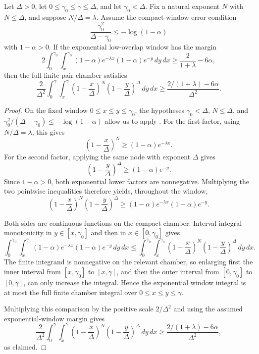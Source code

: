 \begin{helper}
Let \(\Delta>0\), let \(0\le\gamma_0\le\gamma\le\Delta\), and let
\(\gamma_0<\Delta\).  Fix a natural exponent \(N\) with
\(N\le\Delta\), and suppose \(N/\Delta=\lambda\).  Assume the compact-window
error condition
\[
\frac{\gamma_0^2}{\Delta-\gamma_0}\le -\log(1-\alpha)
\]
with \(1-\alpha>0\).  If the exponential low-overlap window has the margin
\[
2\int_0^{\gamma_0}\int_x^{\gamma_0}
(1-\alpha)e^{-\lambda x}(1-\alpha)e^{-y}\,dy\,dx
\ge
\frac{2}{1+\lambda}-6\alpha,
\]
then the full finite pair chamber satisfies
\[
\frac2{\Delta^2}\int_0^\gamma\int_x^\gamma
\left(1-\frac{x}{\Delta}\right)^N
\left(1-\frac{y}{\Delta}\right)^\Delta\,dy\,dx
\ge
\frac{2/(1+\lambda)-6\alpha}{\Delta^2}.
\]
\end{helper}
\begin{proof}
On the fixed window \(0\le x\le y\le\gamma_0\), the hypotheses
\(\gamma_0<\Delta\), \(N\le\Delta\), and
\(\gamma_0^2/(\Delta-\gamma_0)\le-\log(1-\alpha)\) allow us to apply
.  For the first factor, using
\(N/\Delta=\lambda\), this gives
\[
\left(1-\frac{x}{\Delta}\right)^N
\ge (1-\alpha)e^{-\lambda x}.
\]
For the second factor, applying the same node with exponent \(\Delta\) gives
\[
\left(1-\frac{y}{\Delta}\right)^\Delta
\ge (1-\alpha)e^{-y}.
\]
Since \(1-\alpha>0\), both exponential lower factors are nonnegative.
Multiplying the two pointwise inequalities therefore yields, throughout the
window,
\[
\left(1-\frac{x}{\Delta}\right)^N
\left(1-\frac{y}{\Delta}\right)^\Delta
\ge
(1-\alpha)e^{-\lambda x}(1-\alpha)e^{-y}.
\]

Both sides are continuous functions on the compact chamber.  Interval-integral
monotonicity in \(y\in[x,\gamma_0]\) and then in \(x\in[0,\gamma_0]\) gives
\[
\int_0^{\gamma_0}\int_x^{\gamma_0}
(1-\alpha)e^{-\lambda x}(1-\alpha)e^{-y}\,dy\,dx
\le
\int_0^{\gamma_0}\int_x^{\gamma_0}
\left(1-\frac{x}{\Delta}\right)^N
\left(1-\frac{y}{\Delta}\right)^\Delta\,dy\,dx .
\]
The finite integrand is nonnegative on the relevant chamber, so enlarging
first the inner interval from \([x,\gamma_0]\) to \([x,\gamma]\), and then
the outer interval from \([0,\gamma_0]\) to \([0,\gamma]\), can only increase
the integral.  Hence the exponential window integral is at most the full
finite chamber integral over \(0\le x\le y\le\gamma\).

Multiplying this comparison by the positive scale \(2/\Delta^2\) and using
the assumed exponential-window margin gives
\[
\frac2{\Delta^2}\int_0^\gamma\int_x^\gamma
\left(1-\frac{x}{\Delta}\right)^N
\left(1-\frac{y}{\Delta}\right)^\Delta\,dy\,dx
\ge
\frac{2/(1+\lambda)-6\alpha}{\Delta^2},
\]
as claimed.
\end{proof}

